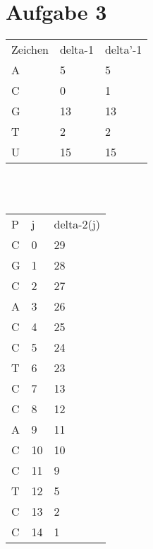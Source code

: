 \documentclass[10pt,a4paper]{article}
\begin{document}
\section{Aufgabe 3}
\begin{tabular}{l|l|l}
  Zeichen & delta-1 & delta'-1\\
  A & 5 & 5\\
  C & 0 & 1\\
  G & 13 & 13\\
  T & 2 & 2\\
  U & 15 & 15\\
\end{tabular}
\\
\\
\begin{tabular}{l|l|l}
  P & j & delta-2(j)\\
  C & 0 & 29\\
  G & 1 & 28\\
  C & 2 & 27\\
  A & 3 & 26\\
  C & 4 & 25\\
  C & 5 & 24\\
  T & 6 & 23\\
  C & 7 & 13\\
  C & 8 & 12\\
  A & 9 & 11\\
  C & 10 & 10\\
  C & 11 & 9\\
  T & 12 & 5\\
  C & 13 & 2\\
  C & 14 & 1\\
\end{tabular}
\end{document}
